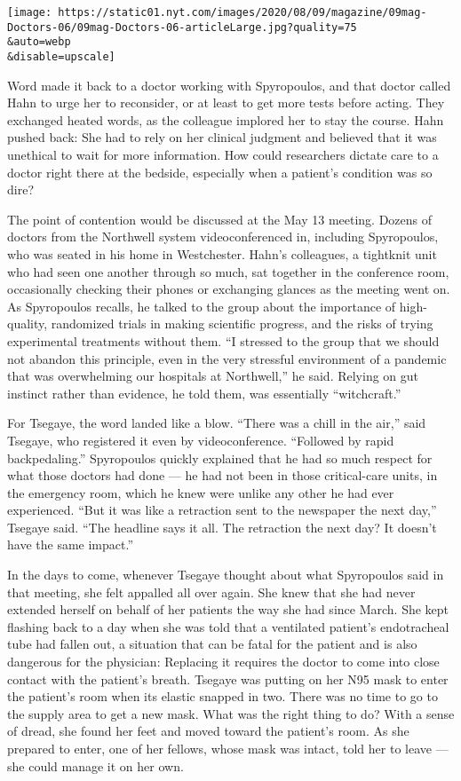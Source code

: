 \texttt{[image: https://static01.nyt.com/images/2020/08/09/magazine/09mag-Doctors-06/09mag-Doctors-06-articleLarge.jpg?quality=75\\\&auto=webp\\\&disable=upscale]}

Word made it back to a doctor working with Spyropoulos, and that doctor
called Hahn to urge her to reconsider, or at least to get more tests
before acting. They exchanged heated words, as the colleague implored
her to stay the course. Hahn pushed back: She had to rely on her
clinical judgment and believed that it was unethical to wait for more
information. How could researchers dictate care to a doctor right there
at the bedside, especially when a patient's condition was so dire?

The point of contention would be discussed at the May 13 meeting. Dozens
of doctors from the Northwell system videoconferenced in, including
Spyropoulos, who was seated in his home in Westchester. Hahn's
colleagues, a tightknit unit who had seen one another through so much,
sat together in the conference room, occasionally checking their phones
or exchanging glances as the meeting went on. As Spyropoulos recalls, he
talked to the group about the importance of high-quality, randomized
trials in making scientific progress, and the risks of trying
experimental treatments without them. ``I stressed to the group that we
should not abandon this principle, even in the very stressful
environment of a pandemic that was overwhelming our hospitals at
Northwell,'' he said. Relying on gut instinct rather than evidence, he
told them, was essentially ``witchcraft.''

For Tsegaye, the word landed like a blow. ``There was a chill in the
air,'' said Tsegaye, who registered it even by videoconference.
``Followed by rapid backpedaling.'' Spyropoulos quickly explained that
he had so much respect for what those doctors had done --- he had not
been in those critical-care units, in the emergency room, which he knew
were unlike any other he had ever experienced. ``But it was like a
retraction sent to the newspaper the next day,'' Tsegaye said. ``The
headline says it all. The retraction the next day? It doesn't have the
same impact.''

In the days to come, whenever Tsegaye thought about what Spyropoulos
said in that meeting, she felt appalled all over again. She knew that
she had never extended herself on behalf of her patients the way she had
since March. She kept flashing back to a day when she was told that a
ventilated patient's endotracheal tube had fallen out, a situation that
can be fatal for the patient and is also dangerous for the physician:
Replacing it requires the doctor to come into close contact with the
patient's breath. Tsegaye was putting on her N95 mask to enter the
patient's room when its elastic snapped in two. There was no time to go
to the supply area to get a new mask. What was the right thing to do?
With a sense of dread, she found her feet and moved toward the patient's
room. As she prepared to enter, one of her fellows, whose mask was
intact, told her to leave --- she could manage it on her own.

